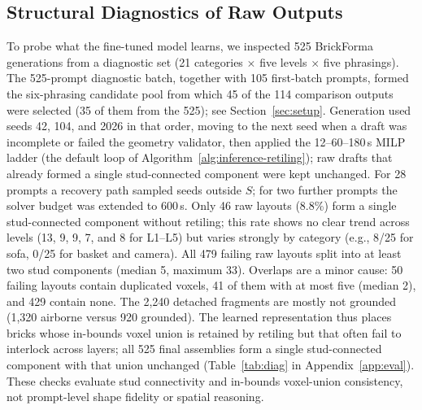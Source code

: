 \documentclass[letterpaper]{article} %
\begin{document}
\subsection{Structural Diagnostics of Raw Outputs}
\label{sec:diagnostics}
To probe what the fine-tuned model learns, we inspected 525 BrickForma generations from a diagnostic set (21 categories $\times$ five levels $\times$ five phrasings). The 525-prompt diagnostic batch, together with 105 first-batch prompts, formed the six-phrasing candidate pool from which 45 of the 114 comparison outputs were selected (35 of them from the 525); see Section~\ref{sec:setup}. Generation used seeds 42, 104, and 2026 in that order, moving to the next seed when a draft was incomplete or failed the geometry validator, then applied the 12--60--180\,s MILP ladder (the default loop of Algorithm~\ref{alg:inference-retiling}); raw drafts that already formed a single stud-connected component were kept unchanged. For 28 prompts a recovery path sampled seeds outside $S$; for two further prompts the solver budget was extended to 600\,s. Only 46 raw layouts (8.8\%) form a single stud-connected component without retiling; this rate shows no clear trend across levels (13, 9, 9, 7, and 8 for L1--L5) but varies strongly by category (e.g., 8/25 for sofa, 0/25 for basket and camera). All 479 failing raw layouts split into at least two stud components (median 5, maximum 33). Overlaps are a minor cause: 50 failing layouts contain duplicated voxels, 41 of them with at most five (median 2), and 429 contain none. The 2,240 detached fragments are mostly not grounded (1,320 airborne versus 920 grounded). The learned representation thus places bricks whose in-bounds voxel union is retained by retiling but that often fail to interlock across layers; all 525 final assemblies form a single stud-connected component with that union unchanged (Table~\ref{tab:diag} in Appendix~\ref{app:eval}). These checks evaluate stud connectivity and in-bounds voxel-union consistency, not prompt-level shape fidelity or spatial reasoning.
\end{document}
